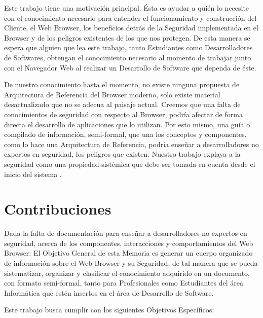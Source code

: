Este trabajo tiene una motivación principal. Ésta es ayudar a quién lo necesite con el conocimiento necesario para entender el funcionamiento y construcción del Cliente, el Web Browser, los beneficios detrás de la Seguridad implementada en el Browser y de los peligros existentes de los que nos protegen. De esta manera se espera que alguien que lea este trabajo, tanto Estudiantes como Desarrolladores de Softwares, obtengan el conocimiento necesario al momento de trabajar junto con el Navegador Web al realizar un Desarrollo de Software que dependa de éste.

De nuestro conocimiento hasta el momento, no existe ninguna propuesta de Arquitectura de Referencia del Browser moderno, solo existe material desactualizado que no se adecua al paisaje actual. Creemos que una falta de conocimientos de seguridad con respecto al Browser, podría afectar de forma directa el desarrollo de aplicaciones que lo utilizan. Por esto mismo, una guía o compilado de información, semi-formal, que una los conceptos y componentes, como lo hace una Arquitectura de Referencia, podría enseñar a desarrolladores no expertos en seguridad, los peligros que existen. Nuestro trabajo explaya a la seguridad como una propiedad sistémica que debe ser tomada en cuenta desde el inicio del sistema \cite{fernandez2004methodology, fernandez2006defining, braz2008eliciting, fernandez2013security}.


\section{Contribuciones}
\label{chap1:contr}

Dada la falta de documentación para enseñar a desarrolladores no expertos en seguridad, acerca de los componentes, interacciones y comportamientos del Web Browser: El Objetivo General de esta Memoria es generar un cuerpo organizado de información sobre el Web Browser y su Seguridad, de tal manera que se pueda sistematizar, organizar y clasificar el conocimiento adquirido en un documento, con formato semi-formal, tanto para Profesionales como Estudiantes del área Informática que estén insertos en el área de Desarrollo de Software. 

Este trabajo busca cumplir con los siguientes Objetivos Específicos:

